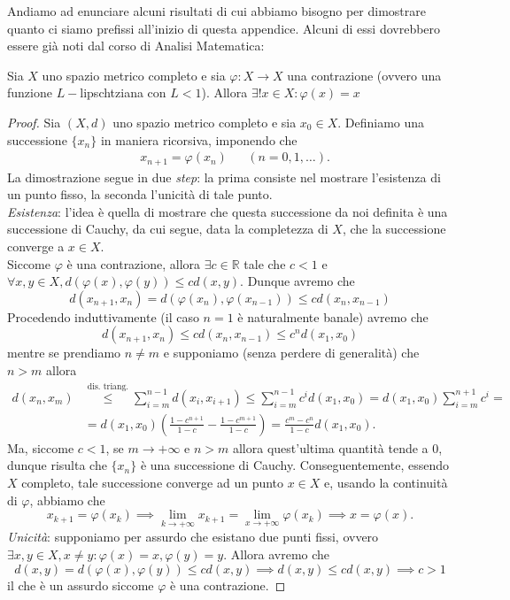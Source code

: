 Andiamo ad enunciare alcuni risultati di cui abbiamo bisogno per dimostrare quanto ci siamo prefissi all'inizio di questa appendice. Alcuni di essi dovrebbero essere già noti dal corso di Analisi Matematica:
\begin{theorem}
	Sia $X$ uno spazio metrico completo e sia $\varphi: X \to X$ una contrazione (ovvero una funzione $L-$lipschtziana con $L < 1$). Allora $\exists ! x \in X : \varphi(x) = x$
\end{theorem}
\begin{proof}
	Sia $(X, d)$ uno spazio metrico completo e sia $x_0 \in X$. Definiamo una successione $\{ x_n \}$ in maniera ricorsiva, imponendo che
	\begin{align*}
		&x_{n+1} = \varphi(x_n) & &(n = 0, 1, \ldots).
	\end{align*}
	La dimostrazione segue in due \emph{step}: la prima consiste nel mostrare l'esistenza di un punto fisso, la seconda l'unicità di tale punto. \\
	\emph{Esistenza}: l'idea è quella di mostrare che questa successione da noi definita è una successione di Cauchy, da cui segue, data la completezza di $X$, che la successione converge a $x \in X$. \\
	Siccome $\varphi$ è una contrazione, allora $\exists c \in \mathbb{R}$ tale che $c < 1$ e $\forall x, y \in X, d(\varphi(x), \varphi(y)) \leq c d(x, y)$. Dunque avremo che
	$$
	d(x_{n+1}, x_n) = d(\varphi(x_n), \varphi(x_{n-1})) \leq c d(x_n, x_{n-1})
	$$
	Procedendo induttivamente (il caso $n=1$ è naturalmente banale) avremo che
	$$
	d(x_{n+1}, x_n) \leq c d(x_n, x_{n-1}) \leq c^n d(x_1, x_0)
	$$
	mentre se prendiamo $n \neq m$ e supponiamo (senza perdere di generalità) che $n > m$ allora
	\begin{align*}
	d(x_n, x_m) &\stackrel{\text{dis. triang.}}{\leq} \sum_{i = m}^{n-1} d(x_i, x_{i+1}) \leq \sum_{i=m}^{n-1} c^{i} d(x_1, x_0) = d(x_1, x_0) \sum_{i=m}^{n+1} c^{i} = \\
	&= d(x_1, x_0) \left( \frac{1-c^{n+1}}{1-c} - \frac{1 - c^{m+1}}{1-c} \right) = \frac{c^{m} - c^{n}}{1-c} d(x_1, x_0).
	\end{align*}
	Ma, siccome $c < 1$, se $m \to +\infty$ e $n > m$ allora quest'ultima quantità tende a $0$, dunque risulta che $\{ x_n \}$ è una successione di Cauchy. Conseguentemente, essendo $X$ completo,
	tale successione converge ad un punto $x \in X$ e, usando la continuità di $\varphi$, abbiamo che
	$$
	x_{k+1} = \varphi(x_k) \implies \lim_{k \to +\infty} x_{k+1} = \lim_{x \to +\infty} \varphi(x_k) \implies x = \varphi(x).
	$$
	\emph{Unicità}: supponiamo per assurdo che esistano due punti fissi, ovvero $\exists x, y \in X, x \neq y : \varphi(x) = x, \varphi(y) = y$. Allora avremo che
	$$
	d(x, y) = d(\varphi(x), \varphi(y)) \leq c d(x, y) \implies d(x, y) \leq c d(x, y) \implies c > 1
	$$
	il che è un assurdo siccome $\varphi$ è una contrazione.
\end{proof}
